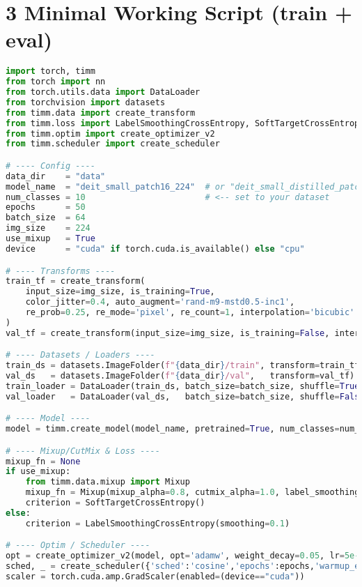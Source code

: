 \documentclass[11pt]{article}
\begin{document}
\section*{3 Minimal Working Script (train + eval)}
\begin{lstlisting}[language=python,style=code]
import torch, timm
from torch import nn
from torch.utils.data import DataLoader
from torchvision import datasets
from timm.data import create_transform
from timm.loss import LabelSmoothingCrossEntropy, SoftTargetCrossEntropy
from timm.optim import create_optimizer_v2
from timm.scheduler import create_scheduler

# ---- Config ----
data_dir    = "data"
model_name  = "deit_small_patch16_224"  # or "deit_small_distilled_patch16_224"
num_classes = 10                        # <-- set to your dataset
epochs      = 50
batch_size  = 64
img_size    = 224
use_mixup   = True
device      = "cuda" if torch.cuda.is_available() else "cpu"

# ---- Transforms ----
train_tf = create_transform(
    input_size=img_size, is_training=True,
    color_jitter=0.4, auto_augment='rand-m9-mstd0.5-inc1',
    re_prob=0.25, re_mode='pixel', re_count=1, interpolation='bicubic'
)
val_tf = create_transform(input_size=img_size, is_training=False, interpolation='bicubic')

# ---- Datasets / Loaders ----
train_ds = datasets.ImageFolder(f"{data_dir}/train", transform=train_tf)
val_ds   = datasets.ImageFolder(f"{data_dir}/val",   transform=val_tf)
train_loader = DataLoader(train_ds, batch_size=batch_size, shuffle=True,  num_workers=8, pin_memory=True)
val_loader   = DataLoader(val_ds,   batch_size=batch_size, shuffle=False, num_workers=8, pin_memory=True)

# ---- Model ----
model = timm.create_model(model_name, pretrained=True, num_classes=num_classes).to(device)

# ---- Mixup/CutMix & Loss ----
mixup_fn = None
if use_mixup:
    from timm.data.mixup import Mixup
    mixup_fn = Mixup(mixup_alpha=0.8, cutmix_alpha=1.0, label_smoothing=0.1, num_classes=num_classes)
    criterion = SoftTargetCrossEntropy()
else:
    criterion = LabelSmoothingCrossEntropy(smoothing=0.1)

# ---- Optim / Scheduler ----
opt = create_optimizer_v2(model, opt='adamw', weight_decay=0.05, lr=5e-4 * (batch_size/256))
sched, _ = create_scheduler({'sched':'cosine','epochs':epochs,'warmup_epochs':5,'cooldown_epochs':0,'min_lr':1e-6}, opt)
scaler = torch.cuda.amp.GradScaler(enabled=(device=="cuda"))


\end{lstlisting}
\end{document}
